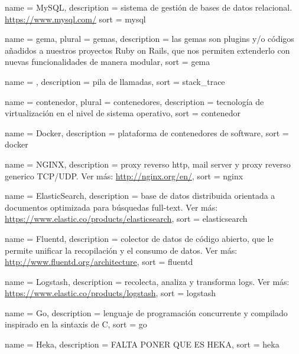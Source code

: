  {
  name        = {MySQL},
  description =
    {sistema de gestión de bases de datos relacional.
    \url{https://www.mysql.com/}}
  sort        = {mysql}
}

 {
  name        = {gema},
  plural      = {gemas},
  description =
    {las gemas son plugins y/o códigos añadidos a nuestros proyectos Ruby on
    Rails, que nos permiten extenderlo con nuevas funcionalidades de manera
    modular},
  sort        = {gema}
}

 {
  name        = {},
  description = {pila de llamadas},
  sort        = {stack_trace}
}

 {
  name        = {contenedor},
  plural      = {contenedores},
  description = {tecnología de virtualización en el nivel de sistema operativo},
  sort        = {contenedor}
}

 {
  name        = {Docker},
  description = {plataforma de contenedores de software},
  sort        = {docker}
}

 {
  name        = {NGINX},
  description =
    {proxy reverso http, mail server y proxy reverso generico TCP/UDP.
    Ver más: \url{http://nginx.org/en/}},
  sort        = {nginx}
}

 {
  name        = {ElasticSearch},
  description =
    {base de datos distribuida orientada a documentos optimizada para búsquedas
    full-text. Ver más: \url{https://www.elastic.co/products/elasticsearch}},
  sort        = {elasticsearch}
}

 {
  name        = {Fluentd},
  description =
    {colector de datos de código abierto, que le permite unificar
    la recopilación y el consumo de datos. Ver más:
    \url{http://www.fluentd.org/architecture}},
  sort        = {fluentd}
}

 {
  name        = {Logstash},
  description =
    {recolecta, analiza y transforma logs. Ver más:
    \url{https://www.elastic.co/products/logstash}},
  sort        = {logstash}
}

 {
  name        = {Go},
  description =
    {lenguaje de programación concurrente y compilado inspirado en la sintaxis
    de C},
  sort        = {go}
}

 {
  name        = {Heka},
  description = {FALTA PONER QUE ES HEKA},
  sort        = {heka}
}

